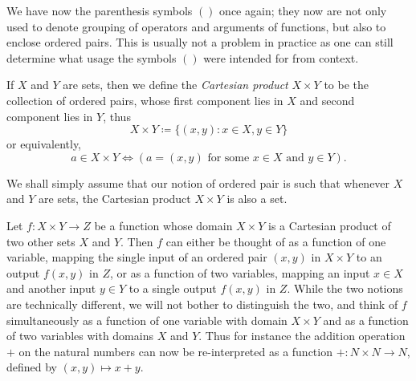 \begin{remark}\label{3.5.3}
We have now  the parenthesis symbols \(()\) once again;
they now are not only used to denote grouping of operators and arguments of functions, but also to enclose ordered pairs.
This is usually not a problem in practice as one can still determine what usage the symbols \(()\) were intended for from context.
\end{remark}

\begin{definition}\label{3.5.4}
If \(X\) and \(Y\) are sets, then we define the \emph{Cartesian product} \(X \times Y\) to be the collection of ordered pairs, whose first component lies in \(X\) and second component lies in \(Y\), thus
\[
    X \times Y \coloneqq \{(x, y) : x \in X, y \in Y\}
\]
or equivalently,
\[
    a \in X \times Y \iff (a = (x, y) \text{ for some } x \in X \text{ and } y \in Y).
\]
\end{definition}

\begin{remark}\label{3.5.5}
We shall simply assume that our notion of ordered pair is such that whenever \(X\) and \(Y\) are sets, the Cartesian product \(X \times Y\) is also a set.
\end{remark}

\begin{note}
Let \(f : X \times Y \to Z\) be a function whose domain \(X \times Y\) is a Cartesian product of two other sets \(X\) and \(Y\).
Then \(f\) can either be thought of as a function of one variable, mapping the single input of an ordered pair \((x, y)\) in \(X \times Y\) to an output \(f(x, y)\) in \(Z\), or as a function of two variables, mapping an input \(x \in X\) and another input \(y \in Y\) to a single output \(f(x, y)\) in \(Z\).
While the two notions are technically different, we will not bother to distinguish the two, and think of \(f\) simultaneously as a function of one variable with domain \(X \times Y\) and as a function of two variables with domains \(X\) and \(Y\).
Thus for instance the addition operation \(+\) on the natural numbers can now be re-interpreted as a function \(+ : N \times N \to N\), defined by \((x, y) \mapsto x + y\).
\end{note}

